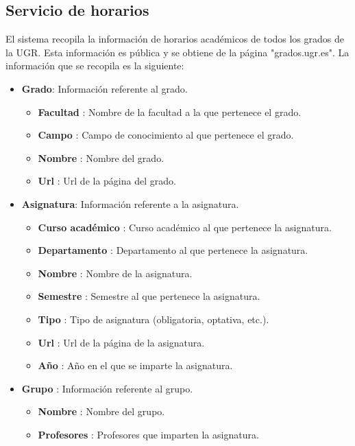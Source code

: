 \subsection{Servicio de horarios}
El sistema recopila la información de horarios académicos de todos los grados de la UGR. Esta información es pública y se obtiene de la página "grados.ugr.es". La información que se recopila es la siguiente:

\begin{itemize}
    \item \textbf{Grado}: Información referente al grado.
    \begin{itemize}
        \item \textbf{Facultad} : Nombre de la facultad a la que pertenece el grado.
        \item \textbf{Campo} : Campo de conocimiento al que pertenece el grado.
        \item \textbf{Nombre} : Nombre del grado.
        \item \textbf{Url} : Url de la página del grado.
    \end{itemize}

    \item \textbf{Asignatura}: Información referente a la asignatura.
    \begin{itemize}
        \item \textbf{Curso académico} : Curso académico al que pertenece la asignatura.
        \item \textbf{Departamento} : Departamento al que pertenece la asignatura.
        \item \textbf{Nombre} : Nombre de la asignatura.
        \item \textbf{Semestre} : Semestre al que pertenece la asignatura.
        \item \textbf{Tipo} : Tipo de asignatura (obligatoria, optativa, etc.).
        \item \textbf{Url} : Url de la página de la asignatura.
        \item \textbf{Año} : Año en el que se imparte la asignatura.
    \end{itemize}

    \item \textbf{Grupo} : Información referente al grupo.
    \begin{itemize}
        \item \textbf{Nombre} : Nombre del grupo.
        \item \textbf{Profesores} : Profesores que imparten la asignatura.
    \end{itemize}


\end{itemize}
